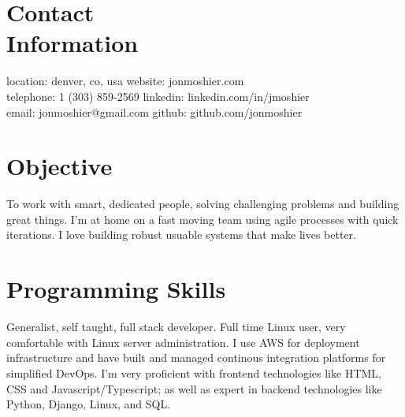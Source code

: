 \documentclass[margin,line]{resume}
\begin{document}
\begin{resume}

    \section{\mysidestyle Contact\\Information}
    location: denver, co, usa   \hfill website: jonmoshier.com\vspace{0mm}\\\vspace{0mm}%
    telephone: 1 (303) 859-2569 \hfill linkedin: linkedin.com/in/jmoshier\vspace{0mm}\\\vspace{0mm}%
    email: jonmoshier@gmail.com \hfill github: github.com/jonmoshier\vspace{0mm}\\\vspace{-4.5mm}%

    \section{\mysidestyle Objective}
 
To work with smart, dedicated people, solving challenging problems and building great things. I'm at home on a fast moving team using agile processes with quick iterations. I love building robust usuable systems that make lives better.
    \section{\mysidestyle Programming Skills} 
	Generalist, self taught, full stack developer. Full time Linux user, very comfortable with Linux server administration. I use AWS for deployment infrastructure and have built and managed continous integration platforms for simplified DevOps. I'm very proficient with frontend technologies like HTML, CSS and Javascript/Typescript; as well as expert in backend technologies like Python, Django, Linux, and SQL.


\end{resume}
\end{document}
